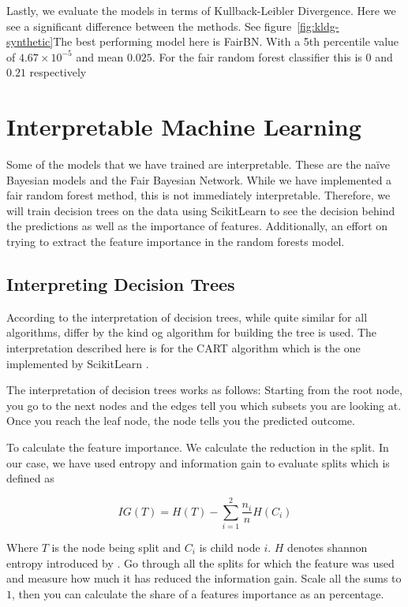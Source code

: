 Lastly, we evaluate the models in terms of Kullback-Leibler Divergence. Here we see a significant difference between the methods. See figure~\ref{fig:kldg-synthetic}The best performing model here is FairBN. With a 5th percentile value of $4.67 \times 10^{-5}$ and mean $0.025$. For the fair random forest classifier this is $0$ and $0.21$ respectively

\section{Interpretable Machine Learning}

Some of the models that we have trained are interpretable. These are the naïve Bayesian models and the Fair Bayesian Network. While we have implemented a fair random forest method, this is not immediately interpretable. Therefore, we will train decision trees on the data using ScikitLearn to see the decision behind the predictions as well as the importance of features. Additionally, an effort on trying to extract the feature importance in the random forests model.

\subsection{Interpreting Decision Trees}

According to \citet{Molnar:2020:Book} the interpretation of decision trees, while quite similar for all algorithms, differ by the kind og algorithm for building the tree is used. The interpretation described here is for the CART algorithm which is the one implemented by ScikitLearn \cite{Pedregosa:2011:JMLR}.

The interpretation of decision trees works as follows: Starting from the root node, you go to the next nodes and the edges tell you which subsets you are looking at. Once you reach the leaf node, the node tells you the predicted outcome. \cite{Molnar:2020:Book}

To calculate the feature importance. We calculate the reduction in the split. In our case, we have used entropy and information gain to evaluate splits which is defined as 

\begin{equation*}
    IG(T) = H(T) - \sum_{i = 1}^{2} \frac{n_i}{n} H(C_i)
\end{equation*}

Where $T$ is the node being split and $C_i$ is child node $i$. $H$ denotes shannon entropy introduced by \citet{Shannon:1948:BellSystTechJ}. Go through all the splits for which the feature was used and measure how much it has reduced the information gain. Scale all the sums to $1$, then you can calculate the share of a features importance as an percentage.

